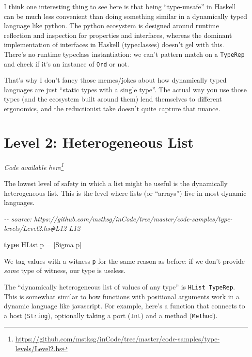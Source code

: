 \documentclass[]{article}
\newenvironment{Shaded}{}{}
\newcommand{\CommentTok}[1]{\textcolor[rgb]{0.38,0.63,0.69}{\textit{#1}}}
\newcommand{\DataTypeTok}[1]{\textcolor[rgb]{0.56,0.13,0.00}{#1}}
\newcommand{\KeywordTok}[1]{\textcolor[rgb]{0.00,0.44,0.13}{\textbf{#1}}}
\newcommand{\NormalTok}[1]{#1}
\newcommand{\OtherTok}[1]{\textcolor[rgb]{0.00,0.44,0.13}{#1}}
\renewcommand{\href}[2]{#2\footnote{\url{#1}}}
\begin{document}
I think one interesting thing to see here is that being ``type-unsafe'' in
Haskell can be much less convenient than doing something similar in a
dynamically typed language like python. The python ecosystem is designed around
runtime reflection and inspection for properties and interfaces, whereas the
dominant implementation of interfaces in Haskell (typeclasses) doesn't gel with
this. There's no runtime typeclass instantiation: we can't pattern match on a
\texttt{TypeRep} and check if it's an instance of \texttt{Ord} or not.

That's why I don't fancy those memes/jokes about how dynamically typed languages
are just ``static types with a single type''. The actual way you use those types
(and the ecosystem built around them) lend themselves to different ergonomics,
and the reductionist take doesn't quite capture that nuance.

\section{Level 2: Heterogeneous List}\label{level-2-heterogeneous-list}

\emph{\href{https://github.com/mstksg/inCode/tree/master/code-samples/type-levels/Level2.hs}{Code
available here}}

The lowest level of safety in which a list might be useful is the dynamically
heterogeneous list. This is the level where lists (or ``arrays'') live in most
dynamic languages.

\begin{Shaded}
\begin{Highlighting}[]
\CommentTok{{-}{-} source: https://github.com/mstksg/inCode/tree/master/code{-}samples/type{-}levels/Level2.hs\#L12{-}L12}

\KeywordTok{type} \DataTypeTok{HList}\NormalTok{ p }\OtherTok{=}\NormalTok{ [}\DataTypeTok{Sigma}\NormalTok{ p]}
\end{Highlighting}
\end{Shaded}

We tag values with a witness \texttt{p} for the same reason as before: if we
don't provide \emph{some} type of witness, our type is useless.

The ``dynamically heterogeneous list of values of any type'' is
\texttt{HList\ TypeRep}. This is somewhat similar to how functions with
positional arguments work in a dynamic language like javascript. For example,
here's a function that connects to a host (\texttt{String}), optionally taking a
port (\texttt{Int}) and a method (\texttt{Method}).
\end{document}
